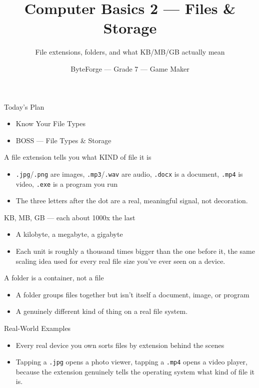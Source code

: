\documentclass[aspectratio=169]{beamer}
\title{Computer Basics 2 — Files \& Storage}
\subtitle{File extensions, folders, and what KB/MB/GB actually mean}
\author{ByteForge --- Grade 7 --- Game Maker}
\date{}
\begin{document}
\begin{frame}
    \titlepage
\end{frame}

\begin{frame}{Today's Plan}
    \begin{itemize}
        \item Know Your File Types
        \item[$\bigstar$] BOSS --- File Types \& Storage
    \end{itemize}
\end{frame}

\begin{frame}{A file extension tells you what KIND of file it is}
    \large
    \begin{itemize}
        \item \texttt{.jpg}/\texttt{.png} are images, \texttt{.mp3}/\texttt{.wav} are audio, \texttt{.docx} is a document, \texttt{.mp4} is video, \texttt{.exe} is a program you run
        \item The three letters after the dot are a real, meaningful signal, not decoration.
    \end{itemize}
\end{frame}


\begin{frame}{KB, MB, GB — each about 1000x the last}
    \large
    \begin{itemize}
        \item A kilobyte, a megabyte, a gigabyte
        \item Each unit is roughly a thousand times bigger than the one before it, the same scaling idea used for every real file size you've ever seen on a device.
    \end{itemize}
\end{frame}


\begin{frame}{A folder is a container, not a file}
    \large
    \begin{itemize}
        \item A folder groups files together but isn't itself a document, image, or program
        \item A genuinely different kind of thing on a real file system.
    \end{itemize}
\end{frame}

\begin{frame}{Real-World Examples}
    \large
    \begin{itemize}
        \item Every real device you own sorts files by extension behind the scenes
        \item Tapping a \texttt{.jpg} opens a photo viewer, tapping a \texttt{.mp4} opens a video player, because the extension genuinely tells the operating system what kind of file it is.
    \end{itemize}
\end{frame}
\end{document}
